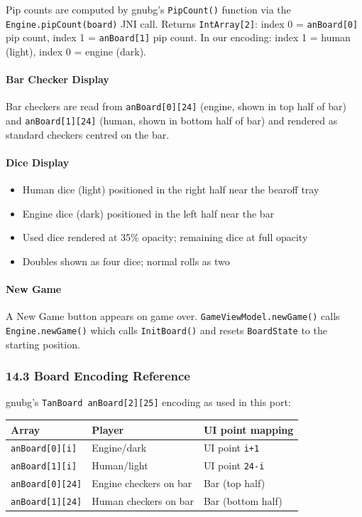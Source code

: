 \documentclass[11pt,a4paper]{article}
\providecommand{\tightlist}{\setlength{\itemsep}{2pt}\setlength{\parskip}{0pt}}
\begin{document}
Pip counts are computed by gnubg's \texttt{PipCount()} function via the
\texttt{Engine.pipCount(board)} JNI call. Returns
\texttt{IntArray[2]}: index 0 = \texttt{anBoard[0]} pip count, index 1
= \texttt{anBoard[1]} pip count. In our encoding: index 1 = human
(light), index 0 = engine (dark).

\paragraph{Bar Checker Display}\label{bar-checker-v094}

Bar checkers are read from \texttt{anBoard[0][24]} (engine, shown in
top half of bar) and \texttt{anBoard[1][24]} (human, shown in bottom
half of bar) and rendered as standard checkers centred on the bar.

\paragraph{Dice Display}\label{dice-display-v094}

\begin{itemize}
\tightlist
\item
  Human dice (light) positioned in the right half near the bearoff
  tray
\item
  Engine dice (dark) positioned in the left half near the bar
\item
  Used dice rendered at 35\% opacity; remaining dice at full opacity
\item
  Doubles shown as four dice; normal rolls as two
\end{itemize}

\paragraph{New Game}\label{new-game-v094}

A New Game button appears on game over. \texttt{GameViewModel.newGame()}
calls \texttt{Engine.newGame()} which calls \texttt{InitBoard()} and
resets \texttt{BoardState} to the starting position.

\subsubsection{14.3 Board Encoding
Reference}\label{board-encoding-v094}

gnubg's \texttt{TanBoard anBoard[2][25]} encoding as used in this port:

\begin{longtable}[]{@{}lll@{}}
\toprule\noalign{}
Array & Player & UI point mapping \\
\midrule\noalign{}
\endhead
\bottomrule\noalign{}
\endlastfoot
\texttt{anBoard[0][i]} & Engine/dark & UI point \texttt{i+1} \\
\texttt{anBoard[1][i]} & Human/light & UI point \texttt{24-i} \\
\texttt{anBoard[0][24]} & Engine checkers on bar & Bar (top half) \\
\texttt{anBoard[1][24]} & Human checkers on bar & Bar (bottom half) \\
\end{longtable}
\end{document}
